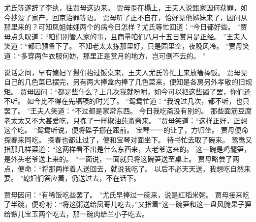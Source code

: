 \par
尤氏等遂辞了李纨，往贾母这边来。
贾母歪在榻上，王夫人说甄家因何获罪，如今抄没了家产，回京治罪等语。
贾母听了正不自在，恰好见他姊妹来了，因问从那里来的？可知凤姐妯娌两个的病今日怎样？尤氏等忙回道：“今日都好些。
”贾母点头叹道：“咱们别管人家的事，且商量咱们八月十五日赏月是正经。
”王夫人笑道：“都已预备下了。
不知老太太拣那里好，只是园里空，夜晚风冷。
”贾母笑道：“多穿两件衣服何妨，那里正是赏月的地方，岂可倒不去的。
”\par
说话之间，早有媳妇丫鬟们抬过饭桌来，王夫人尤氏等忙上来放箸捧饭。
贾母见自己的几色菜已摆完，另有两大捧盒内捧了几色菜来，便知是各房另外孝敬的旧规矩。
贾母因问：“都是些什么？上几次我就吩咐，如今可以把这些蠲了罢，你们还不听。
如今比不得在先辐辏的时光了。
”鸳鸯忙道：“我说过几次，都不听，也只罢了。
”王夫人笑道：“不过都是家常东西。
今日我吃斋没有别的。
那些面筋豆腐老太太又不大甚爱吃，只拣了一样椒油莼齑酱来。
”贾母笑道：“这样正好，正想这个吃。
”鸳鸯听说，便将碟子挪在跟前。
宝琴一一的让了，方归坐。
贾母便命探春来同吃。
探春也都让过了，便和宝琴对面坐下。
待书忙去取了碗来。
鸳鸯又指那几样菜道：“这两样看不出是什么东西来，大老爷送来的。
这一碗是鸡髓笋，是外头老爷送上来的。
”一面说，一面就只将这碗笋送至桌上。
贾母略尝了两点，便命：“将那两样着人送回去，就说我吃了。
以后不必天天送，我想吃自然来要。
”媳妇们答应着，仍送过去，不在话下。
\par
贾母因问：“有稀饭吃些罢了。
”尤氏早捧过一碗来，说是红稻米粥。
贾母接来吃了半碗，便吩咐：“将这粥送给凤哥儿吃去，”又指着“这一碗笋和这一盘风腌果子狸给颦儿宝玉两个吃去，那一碗肉给兰小子吃去。
